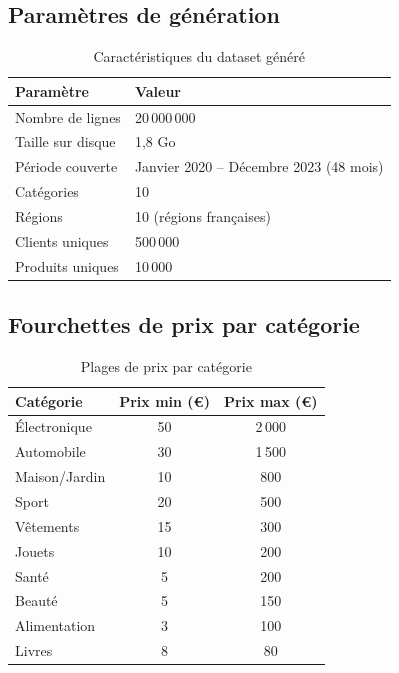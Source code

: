 \documentclass[12pt,a4paper]{article}
\begin{document}
\subsection{Paramètres de génération}

\begin{table}[H]
  \centering
  \caption{Caractéristiques du dataset généré}
  \label{tab:dataset_stats}
  \begin{tabular}{ll}
    \toprule
    \textbf{Paramètre} & \textbf{Valeur} \\
    \midrule
    Nombre de lignes   & 20\,000\,000 \\
    Taille sur disque  & 1,8 Go \\
    Période couverte   & Janvier 2020 -- Décembre 2023 (48 mois) \\
    Catégories         & 10 \\
    Régions            & 10 (régions françaises) \\
    Clients uniques    & 500\,000 \\
    Produits uniques   & 10\,000 \\
    \bottomrule
  \end{tabular}
\end{table}

\subsection{Fourchettes de prix par catégorie}

\begin{table}[H]
  \centering
  \caption{Plages de prix par catégorie}
  \label{tab:prix}
  \begin{tabular}{lcc}
    \toprule
    \textbf{Catégorie} & \textbf{Prix min (€)} & \textbf{Prix max (€)} \\
    \midrule
    Électronique    & 50    & 2\,000 \\
    Automobile      & 30    & 1\,500 \\
    Maison/Jardin   & 10    & 800    \\
    Sport           & 20    & 500    \\
    Vêtements       & 15    & 300    \\
    Jouets          & 10    & 200    \\
    Santé           & 5     & 200    \\
    Beauté          & 5     & 150    \\
    Alimentation    & 3     & 100    \\
    Livres          & 8     & 80     \\
    \bottomrule
  \end{tabular}
\end{table}
\end{document}
